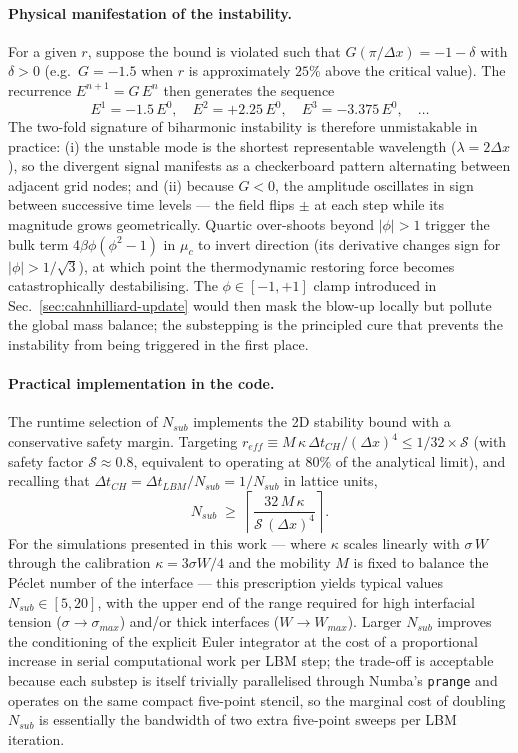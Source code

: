 \paragraph{Physical manifestation of the instability.} For a given $r$, suppose the bound is violated such that $G(\pi/\Delta x) = -1 - \delta$ with $\delta > 0$ (e.g.\ $G = -1.5$ when $r$ is approximately $25\%$ above the critical value).
The recurrence $E^{n+1} = G\,E^n$ then generates the sequence
\begin{equation}
    E^1 = -1.5\,E^0, \quad E^2 = +2.25\,E^0, \quad E^3 = -3.375\,E^0, \quad \ldots
\end{equation}
The two-fold signature of biharmonic instability is therefore unmistakable in practice: (i) the unstable mode is the shortest representable wavelength ($\lambda = 2\Delta x$), so the divergent signal manifests as a checkerboard pattern alternating between adjacent grid nodes;
and (ii) because $G < 0$, the amplitude oscillates in sign between successive time levels --- the field flips $\pm$ at each step while its magnitude grows geometrically.
Quartic over-shoots beyond $|\phi| > 1$ trigger the bulk term $4\beta\phi(\phi^2-1)$ in $\mu_c$ to invert direction (its derivative changes sign for $|\phi| > 1/\sqrt{3}$), at which point the thermodynamic restoring force becomes catastrophically destabilising.
The $\phi \in [-1,+1]$ clamp introduced in Sec.~\ref{sec:cahnhilliard-update} would then mask the blow-up locally but pollute the global mass balance;
the substepping is the principled cure that prevents the instability from being triggered in the first place.

\paragraph{Practical implementation in the code.} The runtime selection of $N_{sub}$ implements the 2D stability bound with a conservative safety margin.
Targeting $r_{eff} \equiv M\,\kappa\,\Delta t_{CH}/(\Delta x)^4 \leq 1/32 \times \mathcal{S}$ (with safety factor $\mathcal{S} \approx 0.8$, equivalent to operating at $80\%$ of the analytical limit), and recalling that $\Delta t_{CH} = \Delta t_{LBM}/N_{sub} = 1/N_{sub}$ in lattice units,
\begin{equation}
    N_{sub} \;\geq\; \left\lceil \frac{32\,M\,\kappa}{\mathcal{S}\,(\Delta x)^4} \right\rceil.
\end{equation}
For the simulations presented in this work --- where $\kappa$ scales linearly with $\sigma\,W$ through the calibration $\kappa = 3\sigma W/4$ and the mobility $M$ is fixed to balance the Péclet number of the interface --- this prescription yields typical values $N_{sub} \in [5, 20]$, with the upper end of the range required for high interfacial tension ($\sigma \to \sigma_{max}$) and/or thick interfaces ($W \to W_{max}$).
Larger $N_{sub}$ improves the conditioning of the explicit Euler integrator at the cost of a proportional increase in serial computational work per LBM step;
the trade-off is acceptable because each substep is itself trivially parallelised through Numba's \texttt{prange} and operates on the same compact five-point stencil, so the marginal cost of doubling $N_{sub}$ is essentially the bandwidth of two extra five-point sweeps per LBM iteration.

